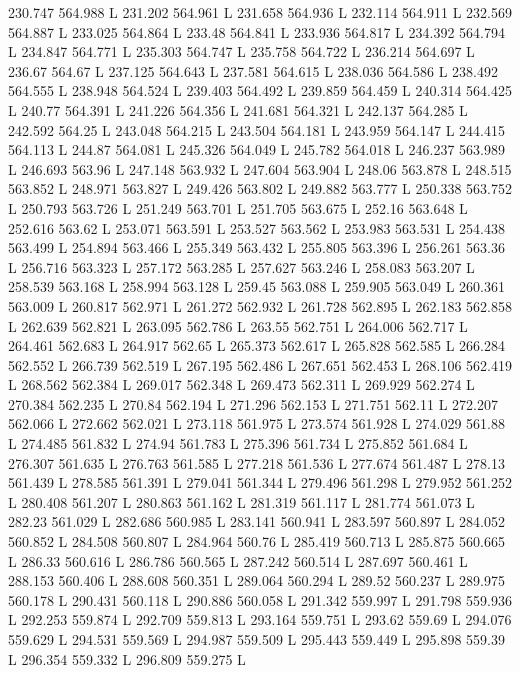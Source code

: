 230.747 564.988 L
231.202 564.961 L
231.658 564.936 L
232.114 564.911 L
232.569 564.887 L
233.025 564.864 L
233.48 564.841 L
233.936 564.817 L
234.392 564.794 L
234.847 564.771 L
235.303 564.747 L
235.758 564.722 L
236.214 564.697 L
236.67 564.67 L
237.125 564.643 L
237.581 564.615 L
238.036 564.586 L
238.492 564.555 L
238.948 564.524 L
239.403 564.492 L
239.859 564.459 L
240.314 564.425 L
240.77 564.391 L
241.226 564.356 L
241.681 564.321 L
242.137 564.285 L
242.592 564.25 L
243.048 564.215 L
243.504 564.181 L
243.959 564.147 L
244.415 564.113 L
244.87 564.081 L
245.326 564.049 L
245.782 564.018 L
246.237 563.989 L
246.693 563.96 L
247.148 563.932 L
247.604 563.904 L
248.06 563.878 L
248.515 563.852 L
248.971 563.827 L
249.426 563.802 L
249.882 563.777 L
250.338 563.752 L
250.793 563.726 L
251.249 563.701 L
251.705 563.675 L
252.16 563.648 L
252.616 563.62 L
253.071 563.591 L
253.527 563.562 L
253.983 563.531 L
254.438 563.499 L
254.894 563.466 L
255.349 563.432 L
255.805 563.396 L
256.261 563.36 L
256.716 563.323 L
257.172 563.285 L
257.627 563.246 L
258.083 563.207 L
258.539 563.168 L
258.994 563.128 L
259.45 563.088 L
259.905 563.049 L
260.361 563.009 L
260.817 562.971 L
261.272 562.932 L
261.728 562.895 L
262.183 562.858 L
262.639 562.821 L
263.095 562.786 L
263.55 562.751 L
264.006 562.717 L
264.461 562.683 L
264.917 562.65 L
265.373 562.617 L
265.828 562.585 L
266.284 562.552 L
266.739 562.519 L
267.195 562.486 L
267.651 562.453 L
268.106 562.419 L
268.562 562.384 L
269.017 562.348 L
269.473 562.311 L
269.929 562.274 L
270.384 562.235 L
270.84 562.194 L
271.296 562.153 L
271.751 562.11 L
272.207 562.066 L
272.662 562.021 L
273.118 561.975 L
273.574 561.928 L
274.029 561.88 L
274.485 561.832 L
274.94 561.783 L
275.396 561.734 L
275.852 561.684 L
276.307 561.635 L
276.763 561.585 L
277.218 561.536 L
277.674 561.487 L
278.13 561.439 L
278.585 561.391 L
279.041 561.344 L
279.496 561.298 L
279.952 561.252 L
280.408 561.207 L
280.863 561.162 L
281.319 561.117 L
281.774 561.073 L
282.23 561.029 L
282.686 560.985 L
283.141 560.941 L
283.597 560.897 L
284.052 560.852 L
284.508 560.807 L
284.964 560.76 L
285.419 560.713 L
285.875 560.665 L
286.33 560.616 L
286.786 560.565 L
287.242 560.514 L
287.697 560.461 L
288.153 560.406 L
288.608 560.351 L
289.064 560.294 L
289.52 560.237 L
289.975 560.178 L
290.431 560.118 L
290.886 560.058 L
291.342 559.997 L
291.798 559.936 L
292.253 559.874 L
292.709 559.813 L
293.164 559.751 L
293.62 559.69 L
294.076 559.629 L
294.531 559.569 L
294.987 559.509 L
295.443 559.449 L
295.898 559.39 L
296.354 559.332 L
296.809 559.275 L
